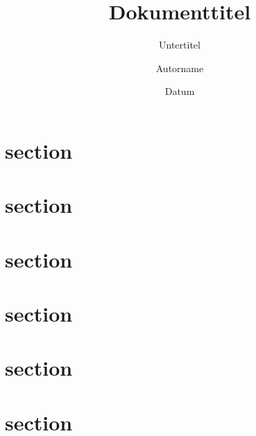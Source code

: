 \documentclass[ngerman]{scrartcl}
\title[Kurzform]{Dokumenttitel}
\subtitle{Untertitel}
\date{Datum}
\author{Autorname}
\begin{document}
 \maketitle


 \section{section}
 \lipsum[1-5]

 \section{section}
 \lipsum[1-5]

 \section{section}
 \lipsum[1-5]

 \section{section}
 \lipsum[1-5]

 \section{section}
 \lipsum[1-5]

 \section{section}
 \lipsum[1-5]
\end{document}
